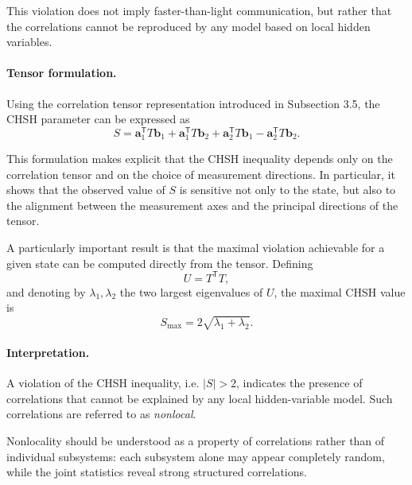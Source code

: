\documentclass[a4paper]{article}
\begin{document}
\medskip

This violation does not imply faster-than-light communication, but rather that the correlations cannot be reproduced by any model based on local hidden variables.

\medskip

\paragraph{Tensor formulation.}

Using the correlation tensor representation introduced in Subsection 3.5, the CHSH parameter can be expressed as
\[
S =
\mathbf{a}_1^{\mathsf T} T \mathbf{b}_1
+
\mathbf{a}_1^{\mathsf T} T \mathbf{b}_2
+
\mathbf{a}_2^{\mathsf T} T \mathbf{b}_1
-
\mathbf{a}_2^{\mathsf T} T \mathbf{b}_2.
\]

\medskip

This formulation makes explicit that the CHSH inequality depends only on the correlation tensor and on the choice of measurement directions. In particular, it shows that the observed value of \( S \) is sensitive not only to the state, but also to the alignment between the measurement axes and the principal directions of the tensor.

\medskip

A particularly important result is that the maximal violation achievable for a given state can be computed directly from the tensor. Defining
\[
U = T^{\mathsf T} T,
\]
and denoting by \( \lambda_1, \lambda_2 \) the two largest eigenvalues of \( U \), the maximal CHSH value is
\[
S_{\max} = 2\sqrt{\lambda_1 + \lambda_2}.
\]

\medskip

\paragraph{Interpretation.}

A violation of the CHSH inequality, i.e. \( |S| > 2 \), indicates the presence of correlations that cannot be explained by any local hidden-variable model. Such correlations are referred to as \emph{nonlocal}.

\medskip

Nonlocality should be understood as a property of correlations rather than of individual subsystems: each subsystem alone may appear completely random, while the joint statistics reveal strong structured correlations.

\medskip
\end{document}
